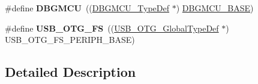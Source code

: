 \begin{DoxyCompactItemize}
\item 
\mbox{\label{group___peripheral__declaration_ga92ec6d9ec2251fda7d4ce09748cd74b4}} 
\#define {\bfseries D\+B\+G\+M\+CU}~((\hyperlink{struct_d_b_g_m_c_u___type_def}{D\+B\+G\+M\+C\+U\+\_\+\+Type\+Def} $\ast$) \hyperlink{group___peripheral__memory__map_ga4adaf4fd82ccc3a538f1f27a70cdbbef}{D\+B\+G\+M\+C\+U\+\_\+\+B\+A\+SE})
\item 
\mbox{\label{group___peripheral__declaration_ga9ebb053ee138fb47cdfede0e3371123d}} 
\#define {\bfseries U\+S\+B\+\_\+\+O\+T\+G\+\_\+\+FS}~((\hyperlink{struct_u_s_b___o_t_g___global_type_def}{U\+S\+B\+\_\+\+O\+T\+G\+\_\+\+Global\+Type\+Def} $\ast$) U\+S\+B\+\_\+\+O\+T\+G\+\_\+\+F\+S\+\_\+\+P\+E\+R\+I\+P\+H\+\_\+\+B\+A\+SE)
\end{DoxyCompactItemize}


\subsection{Detailed Description}
